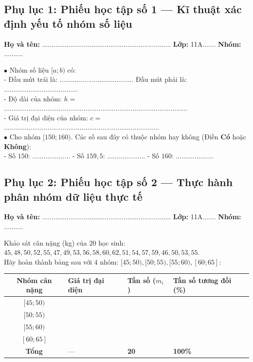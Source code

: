 \documentclass[12pt, a4paper]{article}
\begin{document}
\subsection*{Phụ lục 1: Phiếu học tập số 1 --- Kĩ thuật xác định yếu tố nhóm số liệu}
\noindent\textbf{Họ và tên:} .................................................................... \textbf{Lớp:} 11A....... \textbf{Nhóm:} ..........

\begin{pedabox}
    $\bullet$ Nhóm số liệu $[a; b)$ có:\\
    - Đầu mút trái là: ....................................... Đầu mút phải là: .......................................\\
    - Độ dài của nhóm: $h = $ .................................................................................................\\
    - Giá trị đại diện của nhóm: $c = $ ..................................................................................\\[0.3em]
    $\bullet$ Cho nhóm $[150; 160)$. Các số sau đây có thuộc nhóm hay không (Điền \textbf{Có} hoặc \textbf{Không}):\\
    - Số $150$: .................... \quad - Số $159{,}5$: .................... \quad - Số $160$: ....................
\end{pedabox}

\subsection*{Phụ lục 2: Phiếu học tập số 2 --- Thực hành phân nhóm dữ liệu thực tế}
\noindent\textbf{Họ và tên:} .................................................................... \textbf{Lớp:} 11A....... \textbf{Nhóm:} ..........

\begin{pedabox}
Khảo sát cân nặng (kg) của $20$ học sinh: $45, 48, 50, 52, 55, 47, 49, 53, 56, 58, 60, 62, 51, 54, 57, 59, 46, 50, 53, 55$.\\
Hãy hoàn thành bảng sau với $4$ nhóm: $[45; 50), [50; 55), [55; 60), [60; 65]$:
\begin{center}
\begin{tabularx}{0.9\linewidth}{|c|X|X|X|}
\hline
\textbf{Nhóm cân nặng} & \textbf{Giá trị đại diện} & \textbf{Tần số ($m_i$)} & \textbf{Tần số tương đối (\%)} \\
\hline
$[45; 50)$ & & & \\
$[50; 55)$ & & & \\
$[55; 60)$ & & & \\
$[60; 65]$ & & & \\
\hline
\textbf{Tổng} & --- & \textbf{20} & \textbf{100\%} \\
\hline
\end{tabularx}
\end{center}
\end{pedabox}
\end{document}
